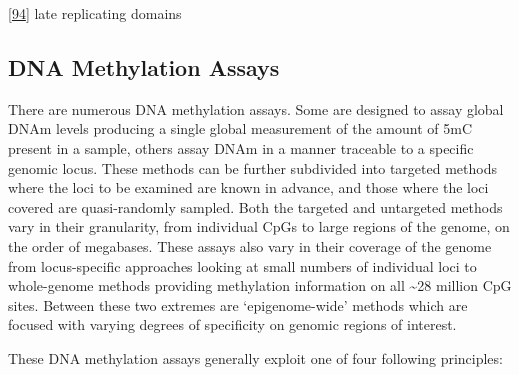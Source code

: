 \documentclass[
]{book}
\begin{document}
{[}\protect\hyperlink{ref-Zhou2018}{94}{]} late replicating domains

\hypertarget{dna-methylation-assays}{%
\subsection{DNA Methylation Assays}\label{dna-methylation-assays}}

There are numerous DNA methylation assays.
Some are designed to assay global DNAm levels producing a single global measurement of the amount of 5mC present in a sample, others assay DNAm in a manner traceable to a specific genomic locus.
These methods can be further subdivided into targeted methods where the loci to be examined are known in advance, and those where the loci covered are quasi-randomly sampled.
Both the targeted and untargeted methods vary in their granularity, from individual CpGs to large regions of the genome, on the order of megabases.
These assays also vary in their coverage of the genome from locus-specific approaches looking at small numbers of individual loci to whole-genome methods providing methylation information on all \textasciitilde28 million CpG sites.
Between these two extremes are `epigenome-wide' methods which are focused with varying degrees of specificity on genomic regions of interest.

These DNA methylation assays generally exploit one of four following principles:
\end{document}
